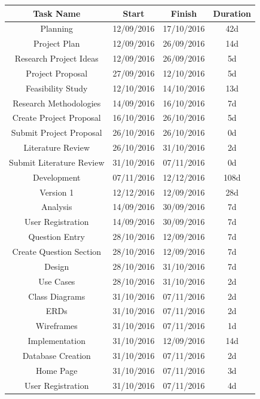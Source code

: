 \begin{table}[h!]
\centering
\begin{tabular}{||c c c c||} 
 \hline
 Task Name & Start & Finish & Duration \\ [0.5ex] 
 \hline\hline
Planning 				& 12/09/2016 & 17/10/2016 & 42d \\ 
Project Plan 			& 12/09/2016 & 26/09/2016 & 14d \\
Research Project Ideas	& 12/09/2016 & 26/09/2016 & 5d \\
Project Proposal 		& 27/09/2016 & 12/10/2016 & 5d \\
Feasibility Study		& 12/10/2016 & 14/10/2016 & 13d \\
Research Methodologies 	& 14/09/2016 & 16/10/2016 & 7d \\
Create Project Proposal   	& 16/10/2016 & 26/10/2016 & 5d \\
Submit Project Proposal   	& 26/10/2016 & 26/10/2016 & 0d \\
Literature Review              	& 26/10/2016 & 31/10/2016 & 2d \\
Submit Literature Review  & 31/10/2016 & 07/11/2016 & 0d \\
Development                     & 07/11/2016 & 12/12/2016 & 108d \\
Version 1                           	& 12/12/2016 & 12/09/2016 & 28d \\
Analysis                            	& 14/09/2016 & 30/09/2016 & 7d \\
User Registration 		& 14/09/2016 & 30/09/2016 & 7d \\
Question Entry 			& 28/10/2016 & 12/09/2016 & 7d \\
Create Question Section   & 28/10/2016 & 12/09/2016 & 7d \\
Design 				& 28/10/2016 & 31/10/2016 & 7d \\
Use Cases 			& 28/10/2016 & 31/10/2016 & 2d \\
Class Diagrams 		& 31/10/2016 & 07/11/2016 & 2d \\
ERDs 				& 31/10/2016 & 07/11/2016 & 2d \\
Wireframes 			& 31/10/2016 & 07/11/2016 & 1d \\
Implementation 		& 31/10/2016 & 12/09/2016 & 14d \\
Database Creation 		& 31/10/2016 & 07/11/2016 & 2d \\
Home Page 			& 31/10/2016 & 07/11/2016 & 3d \\
User Registration 		& 31/10/2016 & 07/11/2016 & 4d \\

\end{tabular}
\end{table}

